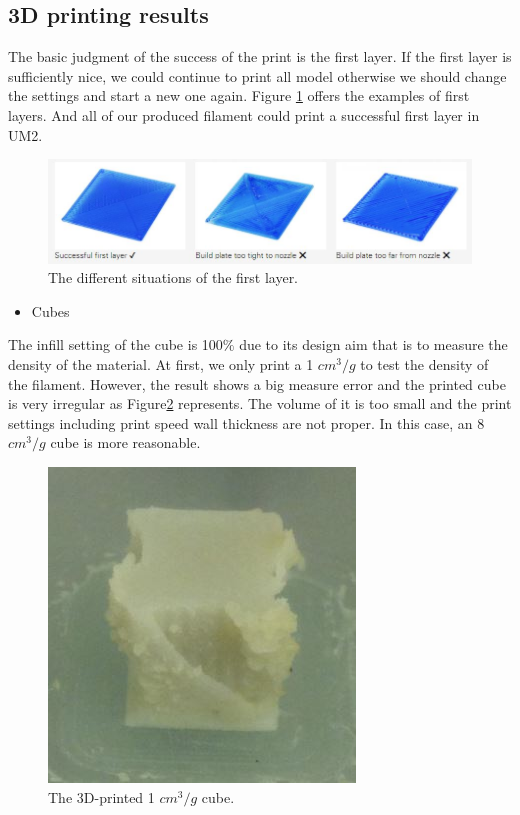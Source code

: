 \subsection{3D printing results}
The basic judgment of the success of the print is the first layer. If the first layer is sufficiently nice, we could continue to print all model otherwise we should change the settings and start a new one again. Figure \ref{Fig:first layer} offers the examples of first layers. And all of our produced filament could print a successful first layer in UM2.
\begin{figure}[htbp]
  \centering
  \includegraphics[scale=0.65]{Figs5//first_layer.JPG}
  \caption[The different situations of the first layer]{\footnotesize The different situations of the first layer.}
  \label{Fig:first layer}
\end{figure}
\begin{itemize}
\item Cubes
\end{itemize}
The infill setting of the cube is 100$\%$ due to its design aim that is to measure the density of the material. At first, we only print a 1 $cm^3/g$ to test the density of the filament. However, the result shows a big measure error and the printed cube is very irregular as Figure\ref{Fig:bad cube} represents. The volume of it is too small and the print settings including print speed wall thickness are not proper. In this case, an 8 $cm^3/g$ cube is more reasonable.
\begin{figure}[t]
  \centering
  \includegraphics[scale=0.6]{Figs5//bad_cube.JPG}
  \caption[The 3D-printed 1 $cm^3/g$ cube]{\footnotesize The 3D-printed 1 $cm^3/g$ cube.}
  \label{Fig:bad cube}
\end{figure}
